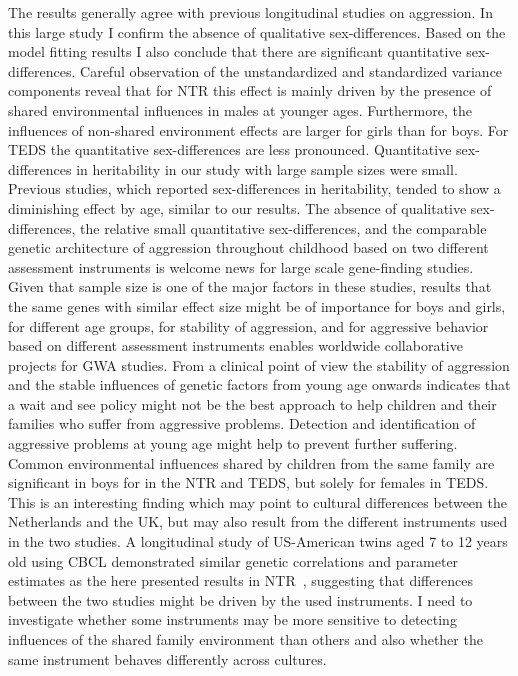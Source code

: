 The results generally agree with previous longitudinal studies on aggression.
In this large study I confirm the absence of qualitative sex-differences.
Based on the model fitting results I also conclude that there are significant quantitative sex-differences.
Careful observation of the unstandardized and standardized variance components reveal that for NTR this effect is mainly driven by the presence of shared environmental influences in males at younger ages.
Furthermore, the influences of non-shared environment effects are larger for girls than for boys.
For TEDS the quantitative sex-differences are less pronounced.
Quantitative sex-differences in heritability in our study with large sample sizes were small.
Previous studies, which reported sex-differences in heritability, tended to show a diminishing effect by age, similar to our results.
The absence of qualitative sex-differences, the relative small quantitative sex-differences, and the comparable genetic architecture of aggression throughout childhood based on two different assessment instruments is welcome news for large scale gene-finding studies.
Given that sample size is one of the major factors in these studies, results that the same genes with similar effect size might be of importance for boys and girls, for different age groups, for stability of aggression, and for aggressive behavior based on different assessment instruments enables worldwide collaborative projects for GWA studies. 
From a clinical point of view the stability of aggression and the stable influences of genetic factors from young age onwards indicates that a wait and see policy might not be the best approach to help children and their families who suffer from aggressive problems.
Detection and identification of aggressive problems at young age might help to prevent further suffering.
Common environmental influences shared by children from the same family are significant in boys for in the NTR and TEDS, but solely for females in TEDS.
This is an interesting finding which may point to cultural differences between the Netherlands and the UK, but may also result from the different instruments used in the two studies.
A longitudinal study of US-American twins aged 7 to 12 years old using CBCL demonstrated similar genetic correlations and parameter estimates as the here presented results in NTR~\cite{Haberstick2006}, suggesting that differences between the two studies might be driven by the used instruments.
I need to investigate whether some instruments may be more sensitive to detecting influences of the shared family environment than others and also whether the same instrument behaves differently across cultures.
